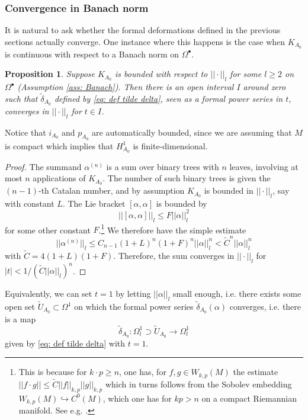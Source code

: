 \documentclass[11pt,a4paper]{amsart}
\theoremstyle{plain} %
\newtheorem{prop}[thm]{Proposition}
\theoremstyle{definition}
\theoremstyle{remark}
\newcommand{\til}{\widetilde}
\begin{document}
\subsubsection{Convergence in Banach norm}
It is natural to ask whether the formal deformations defined in the previous sections actually converge. One instance where this happens is the case when $K_{A_0}$ is continuous with respect to a Banach norm on $\Omega^\bullet$. 
\begin{prop}\label{prop: banach convergence}
Suppose $K_{A_0}$ is bounded with respect to $||\cdot||_{l}$ for some $l \geq 2$ on $\Omega^\bullet$ (Assumption \ref{ass: Banach}). Then there is an open interval $I$ around zero such that  $\til{\delta}_{A_0}$ defined by \eqref{eq: def tilde delta}, seen as a formal power series in $t$, converges in $||\cdot||_l$ for $t\in I$.     
\end{prop}
Notice that $i_{A_0}$ and $p_{A_0}$ are automatically bounded, since we are assuming that $M$ is compact which implies that $H^1_{A_0}$ is finite-dimensional.
\begin{proof}
    The summand $\alpha^{(n)}$ is a sum over binary trees with $n$ leaves, involving at most $n$ applications of $K_{A_0}$. The number of such binary trees is given the $(n-1)$-th Catalan number, and by assumption $K_{A_0}$ is bounded in $||\cdot||_l$, say with constant $L$. The Lie bracket $[\alpha,\alpha]$ is bounded by \begin{equation}
        ||[\alpha,\alpha]||_l \leq F ||\alpha||^2_l
    \end{equation} for some other constant $F$.\footnote{This is because for $k \cdot p \geq n$, one has, for $f,g \in W_{k,p}(M)$ the estimate $||f \cdot g || \leq \til{C} ||f||_{k,p} ||g||_{k,p}$ which in turns follows from the Sobolev embedding $W_{k,p}(M) \hookrightarrow C^{0}(M)$, which one has for $kp > n$ on a compact Riemannian manifold. See e.g. \cite[Theorem 2.10, Theorem 2.20]{Aubin}.} We therefore have the simple estimate 
    $$||\alpha^{(n)}||_l \leq C_{n-1} (1+L)^n (1+F)^n ||\alpha||^n_l < \til{C}^n ||\alpha||^n_l$$
    with $\til{C} = 4 (1+L)(1+F)$. Therefore, the sum converges in $||\cdot||_l$ for $|t|< 1/ (\til{C}||\alpha||_l)^n$. 
\end{proof}
Equivalently, we can set $t=1$ by letting $||\alpha||_l$ small enough, i.e. there exists some open set  $\til{U}_{A_0} \subset \Omega^1$  on which the formal power series  $\til{\delta}_{A_0}(\alpha)$ converges,  i.e. there is a map 
\begin{equation}
    \til{\delta}_{A_0}\colon \Omega^1_l \supset \til{U}_{A_0} \to \Omega^1_l
\end{equation} given by \eqref{eq: def tilde delta} with $t=1$. 
\end{document}
